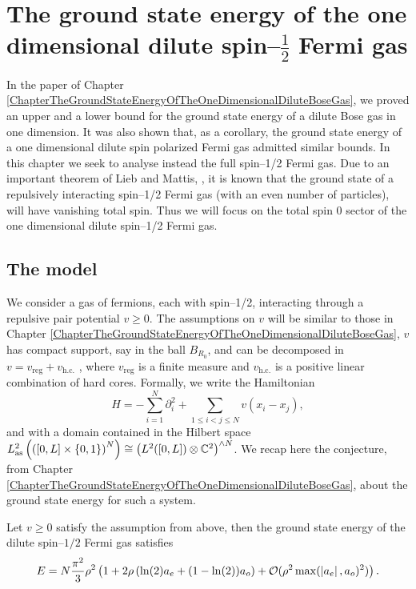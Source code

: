 \chapter{The ground state energy of the one dimensional dilute spin--$ \frac{1}{2} $ Fermi gas}
\label{ChapterTheGroundStateEnergyOfTheOneDimensionalDiluteSpin1/2FermiGas}
In the paper of Chapter \ref{ChapterTheGroundStateEnergyOfTheOneDimensionalDiluteBoseGas}, we proved an upper and a lower bound for the ground state energy of a dilute Bose gas in one dimension. It was also shown that, as a corollary, the ground state energy of a one dimensional dilute spin polarized Fermi gas admitted similar bounds. In this chapter we seek to analyse instead the full spin--1/2 Fermi gas. Due to an important theorem of Lieb and Mattis, \cite{lieb1962theory}, it is known that the ground state of a repulsively interacting spin--1/2 Fermi gas (with an even number of particles), will have vanishing total spin. Thus we will focus on the total spin $ 0 $ sector of the one dimensional dilute spin--1/2 Fermi gas.
\section{The model}
We consider a gas of fermions, each with spin--1/2, interacting through a repulsive pair potential $ v\geq 0 $. The assumptions on $ v $ will be similar to those in Chapter \ref{ChapterTheGroundStateEnergyOfTheOneDimensionalDiluteBoseGas}, \ie $ v $ has compact support, say in the ball $ B_{R_0} $, and can be decomposed in $ v=v_{\text{reg}}+v_{\text{h.c.}} $ , where $ v_{\text{reg}} $ is a finite measure and $ v_{\text{h.c.}} $ is a positive linear combination of hard cores. Formally, we write the Hamiltonian \begin{equation}\label{EqFermi1/2Hamiltonian}
H=-\sum_{i=1}^{N}\partial_i^2+\sum_{1\leq i<j\leq N} v(x_i-x_j),
\end{equation}
and with a domain contained in the Hilbert space $ L^2_{\text{as}}\left(\left([0,L]\times \{0,1\}\right)^N\right)\cong \left(L^2([0,L])\otimes \mathbb{C}^2\right)^{\wedge N} $.
We recap here the conjecture, from Chapter \ref{ChapterTheGroundStateEnergyOfTheOneDimensionalDiluteBoseGas}, about the ground state energy for such a system. \begin{conjecture}\label{ConjectureEqCSpin1/2FermiGroundStateEnergy}
	Let $ v\geq0 $ satisfy the assumption from above, then the ground state energy of the dilute spin--$ 1/2 $ Fermi gas satisfies\begin{equation}\label{EqConjectureEqCSpin1/2FermiGroundStateEnergy}
	E=N\frac{\pi^2}{3}\rho^2\left(1+2\rho \left(\ln(2) a_e+(1-\ln(2))a_o\right)+\mathcal{O}(\rho^2\max(\left\lvert a_e \right\rvert,a_o)^2)\right).
	\end{equation}
\end{conjecture}
